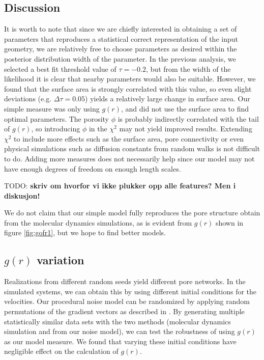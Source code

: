 \documentclass[aps,pre,twocolumn,letterpaper,floatfix,showpacs]{revtex4}
\newcommand{\todo}[1]{ {\color{Magenta} TODO: \color{Blue} \textbf{#1} }}
\begin{document}
\subsection{Discussion}
It is worth to note that since we are chiefly interested in obtaining a set of
parameters that reproduces a statistical correct representation of the input geometry,
we are relatively free to choose parameters as desired within the posterior distribution width of the parameter.
In the previous analysis, we selected a best fit threshold value of $\tau=-0.2$,
but from the width of the likelihood it is clear that nearby parameters would also be suitable. 
However, we found that the surface area is strongly correlated with this value, so even slight
deviations (e.g. $\Delta \tau = 0.05$) yields a relatively large change in surface area.
Our simple measure was only using $g(r)$, and did not use the surface area to find optimal parameters.
The porosity $\phi$ is probably indirectly correlated with the tail of $g(r)$, so introducing $\phi$ in the $\chi^2$ may not yield improved results.
Extending $\chi^2$ to include more effects such as the surface area, pore connectivity or even physical simulations such as diffusion constants from random walks is not difficult to do.
Adding more measures does not necessarily help since our model may not have enough degrees of freedom on enough length scales.

\todo{skriv om hvorfor vi ikke plukker opp alle features? Men i diskusjon!}

We do not claim that our simple model fully reproduces the pore structure obtain from the molecular dynamics simulations, as is evident from $g(r)$ shown in figure \ref{fig:gofr1},
but we hope to find better models.

\subsection{$g(r)$ variation}
Realizations from different random seeds yield different pore networks.
In the simulated systems, we can obtain this by using different initial conditions for the velocities.
Our procedural noise model can be randomized by applying random permutations of the gradient vectors as described in \cite{perlin1985image}.
By generating multiple statistically similar data sets with the two methods (molecular dynamics simulation and from our noise model), we can test the robustness of using $g(r)$ as our model measure.
We found that varying these initial conditions have negligible effect on the calculation of $g(r)$.
\end{document}
